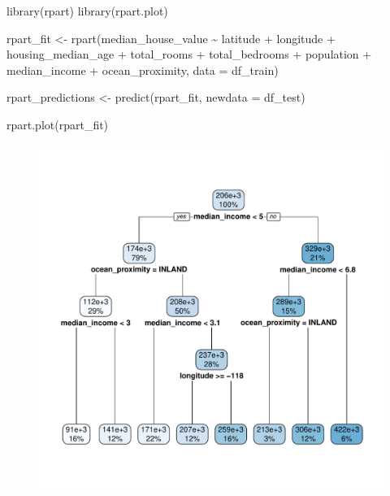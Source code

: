 \documentclass[
  letterpaper,
  DIV=11,
  numbers=noendperiod]{scrartcl}
\newenvironment{Shaded}{\begin{snugshade}}{\end{snugshade}}
\newcommand{\AttributeTok}[1]{\textcolor[rgb]{0.40,0.45,0.13}{#1}}
\newcommand{\FunctionTok}[1]{\textcolor[rgb]{0.28,0.35,0.67}{#1}}
\newcommand{\NormalTok}[1]{\textcolor[rgb]{0.00,0.23,0.31}{#1}}
\newcommand{\OtherTok}[1]{\textcolor[rgb]{0.00,0.23,0.31}{#1}}
\newcommand{\SpecialCharTok}[1]{\textcolor[rgb]{0.37,0.37,0.37}{#1}}
\begin{document}
\begin{Shaded}
\begin{Highlighting}[]
\FunctionTok{library}\NormalTok{(rpart)}
\FunctionTok{library}\NormalTok{(rpart.plot)}

\NormalTok{rpart\_fit }\OtherTok{\textless{}{-}} \FunctionTok{rpart}\NormalTok{(median\_house\_value }\SpecialCharTok{\textasciitilde{}}\NormalTok{ latitude }\SpecialCharTok{+}\NormalTok{ longitude }\SpecialCharTok{+}\NormalTok{ housing\_median\_age }\SpecialCharTok{+} 
\NormalTok{                   total\_rooms }\SpecialCharTok{+}\NormalTok{ total\_bedrooms }\SpecialCharTok{+}\NormalTok{ population }\SpecialCharTok{+}\NormalTok{ median\_income }\SpecialCharTok{+} 
\NormalTok{                   ocean\_proximity, }\AttributeTok{data =}\NormalTok{ df\_train)}

\NormalTok{rpart\_predictions }\OtherTok{\textless{}{-}} \FunctionTok{predict}\NormalTok{(rpart\_fit, }\AttributeTok{newdata =}\NormalTok{ df\_test)}

\FunctionTok{rpart.plot}\NormalTok{(rpart\_fit)}
\end{Highlighting}
\end{Shaded}

\begin{figure}[H]

{\centering \includegraphics{hw5_files/figure-pdf/unnamed-chunk-7-1.pdf}

}

\end{figure}
\end{document}
